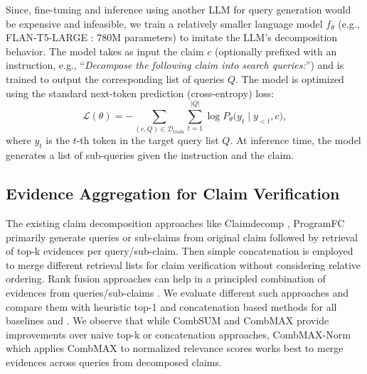 Since, fine-tuning and inference using another LLM for query generation would be expensive and infeasible, we train a relatively smaller language model $f_\theta$ (e.g., FLAN-T5-LARGE : 780M parameters) 
to imitate the LLM's decomposition behavior. 
The model takes as input the claim $c$ (optionally prefixed with an instruction, 
e.g., ``\textit{Decompose the following claim into search queries:}'') 
and is trained to output the corresponding list of queries $Q$.
The model is optimized using the standard next-token prediction (cross-entropy) loss:
\[
\mathcal{L}(\theta) = - \sum_{(c, Q) \in \mathcal{D}_{\text{train}}} 
\sum_{t=1}^{|Q|} \log P_\theta \big(y_t \mid y_{<t}, c \big),
\]
where $y_t$ is the $t$-th token in the target query list $Q$. At inference time, the model generates a list of sub-queries given the instruction and the claim. 
\vspace{-1em}
\subsection{ Evidence Aggregation for Claim Verification}
The existing claim decomposition approaches like Claimdecomp \cite{claimdecomp}, ProgramFC \cite{programFC} primarily generate queries or sub-claims from original claim followed by retrieval of top-k evidences per query/sub-claim. Then simple concatenation is employed to merge different retrieval lists for claim verification without considering relative ordering. Rank fusion approaches can help in a principled combination of evidences from queries/sub-claims \cite{irfusion,dark_horse_error,irfusion2}.  We evaluate different such approaches and compare them with heuristic top-1 and concatenation based methods for all baselines and \name{}. We observe that while CombSUM and CombMAX provide improvements over naive top-k or concatenation approaches, CombMAX-Norm which applies CombMAX to normalized relevance scores works best to merge evidences across queries from decomposed claims.  %